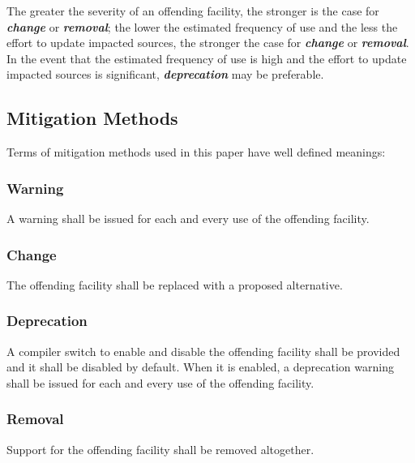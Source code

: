 \documentclass[10pt,a4paper,leqno,fleqn]{article}
\renewcommand{\emph}[1]{\textbf{\textit{#1}}}
\begin{document}
\noindent The greater the severity of an \gls{offending facility}, the stronger
is the case for \emph{change} or \emph{removal}; the lower the estimated
frequency of use and the less the effort to update impacted sources, the
stronger the case for \emph{change} or \emph{removal}. In the event that
the estimated frequency of use is high and the effort to update impacted
sources is significant, \emph{deprecation} may be preferable.


\subsection{Mitigation Methods}

Terms of mitigation methods used in this paper have well defined meanings:

\subsubsection{Warning}

A warning shall be issued for each and every use of the
\gls{offending facility}.

\subsubsection{Change}

The \gls{offending facility} shall be replaced with a proposed alternative.

\subsubsection{Deprecation}

A compiler switch to enable and disable the \gls{offending facility} shall
be provided and it shall be disabled by default. When it is enabled, a
deprecation warning shall be issued for each and every use of the
\gls{offending facility}.

\subsubsection{Removal}

Support for the \gls{offending facility} shall be removed altogether.\\
\end{document}
